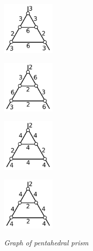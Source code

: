 \documentclass[suppldata, dvipdfmx]{interact}
\theoremstyle{plain}%
\theoremstyle{definition}
\theoremstyle{remark}
\theoremstyle{problemstyle}
\begin{document}
\begin{figure}[h!tbp]
\begin{minipage}[t]{0.69\textwidth}
\begin{minipage}[t]{0.23\textwidth}
   \subcaption{}
   \label{}
  \end{minipage}
 \hspace*{\fill}
  \begin{minipage}[t]{0.23\textwidth}
   \centering
   \includegraphics[width=1in, keepaspectratio]{./img/HexahedraWithSphericalFaces/pentahedralPrism/pentahedralPrism_c.png}
   \subcaption{}
   \label{}
  \end{minipage}
 \hspace*{\fill}
  \begin{minipage}[t]{0.23\textwidth}
   \centering
   \includegraphics[width=1in, keepaspectratio]{./img/HexahedraWithSphericalFaces/pentahedralPrism/pentahedralPrism_d.png}
   \subcaption{}
   \label{}
  \end{minipage}
 \hspace*{\fill}
  \begin{minipage}[t]{0.23\textwidth}
   \centering
   \includegraphics[width=1in, keepaspectratio]{./img/HexahedraWithSphericalFaces/pentahedralPrism/pentahedralPrism_e.png}
   \subcaption{}
   \label{}
  \end{minipage}
 \hspace*{\fill}
  \begin{minipage}[t]{0.23\textwidth}
   \centering
   \includegraphics[width=1in, keepaspectratio]{./img/HexahedraWithSphericalFaces/pentahedralPrism/pentahedralPrism_f.png}
   \subcaption{}
   \label{}
  \end{minipage}
 \hspace*{\fill}
  \caption{\textit{Graph of pentahedral prism}}
  \label{fig:pentahedralPrismList}
 \end{minipage}
\end{figure}
\end{document}
